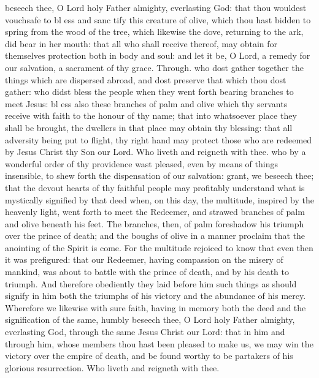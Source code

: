 {} beseech thee, O Lord holy Father almighty, everlasting God: that thou wouldest vouchsafe to bl {} ess and sanc {} tify this creature of olive, which thou hast bidden to spring from the wood of the tree, which likewise the dove, returning to the ark, did bear in her mouth: that all who shall receive thereof, may obtain for themselves protection both in body and soul: and let it be, O Lord, a remedy for our salvation, a sacrament
of thy grace. Through.
{} who dost gather together the things which are dispersed abroad, and dost preserve that which thou dost gather: who didst bless the people when they went forth bearing branches to meet Jesus: bl {} ess also these branches of palm and olive which thy servants receive with faith to the honour of thy name; that into whatsoever place they shall be brought, the dwellers in that place may obtain thy blessing: that all adversity being put to flight, thy right hand may protect those who are redeemed by Jesus Christ thy Son our Lord. Who liveth and reigneth with thee.
{} who by a wonderful order of thy providence wast pleased, even by means of things insensible, to shew forth the dispensation of our salvation: grant, we beseech thee; that the devout hearts of thy faithful people may profitably understand what is mystically signified by that deed when, on this day, the multitude, inspired by the heavenly light, went forth to meet the Redeemer, and strawed branches of palm and olive beneath his feet. The branches, then, of palm foreshadow his triumph over the prince of death; and the boughs of olive in a manner proclaim that the anointing of the Spirit is come. For the multitude rejoiced to know that even then it was prefigured: that our Redeemer, having compassion on the misery of mankind, was about to battle with the prince of death, and by his death to triumph. And therefore obediently they laid before him such things as should signify in him both the triumphs of his victory and the abundance of his mercy. Wherefore we likewise with sure faith, having in memory both the deed and the signification of the same, humbly beseech thee, O Lord holy Father almighty, everlasting God, through the same Jesus Christ our Lord: that in him and through him, whose members thou hast been pleased to make us, we may win the victory over the empire of death, and be found worthy to be partakers of his glorious resurrection. Who liveth and reigneth with thee.
